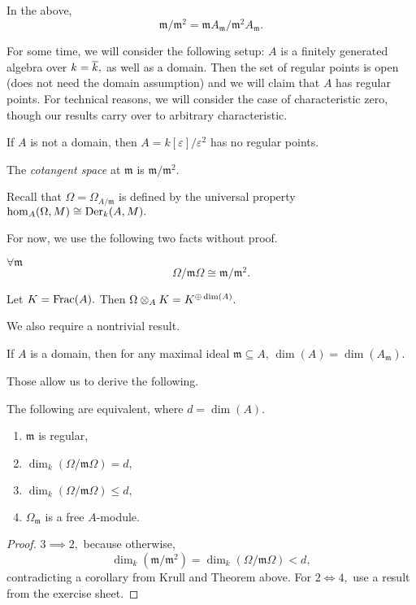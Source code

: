 \begin{note}
  In the above,
  \[\mathfrak m /{\mathfrak m^2} = \mathfrak m A_{\mathfrak m} /{\mathfrak m^2 A_{\mathfrak m}}.\]
\end{note}

For some time, we will consider the following setup: \(A\) is a finitely generated algebra over \(k = \overline{k},\) as well as a domain. Then the set of regular points is open (does not need the domain assumption) and we will claim that \(A\) has regular points.
For technical reasons, we will consider the case of characteristic zero, though our results carry over to arbitrary characteristic.

\begin{example}
  If \(A\) is not a domain, then \(A = k[\varepsilon]/{\varepsilon^2}\) has no regular points.
\end{example}

\begin{df}
  The \emph{cotangent space} at \(\mathfrak m\) is \(\mathfrak m / {\mathfrak m^2}.\)
\end{df}

Recall that \(\Omega = \Omega_{A /{\mathfrak m}}\) is defined by the universal property
\(\hom_A(\Omega, M) \cong \operatorname{Der}_k(A, M).\)

For now, we use the following two facts without proof.

\begin{lemma}
  \(\forall \mathfrak m\)
  \[\Omega /{\mathfrak m \Omega} \cong \mathfrak m /{\mathfrak m^2}.\]
\end{lemma}

\begin{lemma}
  Let \(K = \mathrm{Frac}(A).\) Then
  \(\Omega \otimes_A K = K^{\oplus \dim(A)}.\)
\end{lemma}

We also require a nontrivial result.
\begin{theorem}
  If \(A\) is a domain, then for any maximal ideal \(\mathfrak m \subseteq A\),
  \(\dim(A) = \dim(A_{\mathfrak m}).\)
\end{theorem}

Those allow us to derive the following.

\begin{prop}
  \label{prop omega}
  The following are equivalent, where \(d = \dim(A).\)
  \begin{enumerate}
  \item \(\mathfrak m\) is regular,
  \item \(\dim_k(\Omega /{\mathfrak m \Omega}) = d,\)
  \item \(\dim_k(\Omega / {\mathfrak m \Omega}) \leq d,\)
  \item \(\Omega_{\mathfrak m}\) is a free \(A\)-module.
  \end{enumerate}
\end{prop}
\begin{proof}
  \(3 \implies 2,\) because otherwise,
  \[\dim_k(\mathfrak m /{\mathfrak m^2}) = \dim_k(\Omega / {\mathfrak m \Omega}) < d,\]
  contradicting a corollary from Krull and Theorem above.
  For \(2 \iff 4,\) use a result from the exercise sheet.
\end{proof}

